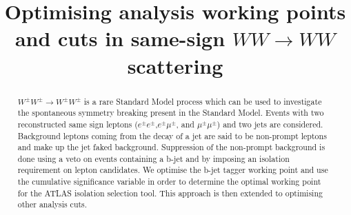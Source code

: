 \documentclass{article}
\title{Optimising analysis working points and cuts in same-sign $WW \longrightarrow WW$ scattering}
\begin{document}
\maketitle
\begin{abstract}
$ W^{\pm}W^{\pm} \longrightarrow W^{\pm}W^{\pm}$ is a rare Standard Model process which can be used to investigate the spontaneous symmetry breaking present in the Standard Model. Events with two reconstructed same sign leptons ($e^{\pm}e^{\pm}$,$e^{\pm}\mu^{\pm}$, and $\mu^{\pm}\mu^{\pm}$) and two jets are considered. Background leptons coming from the decay of a jet are said to be non-prompt leptons and make up the jet faked background. Suppression of the non-prompt background is done using a veto on events containing a b-jet and by imposing an isolation requirement on lepton candidates. We optimise the b-jet tagger working point and use the cumulative significance variable in order to determine the optimal working point for the ATLAS isolation selection tool. This approach is then extended to optimising other analysis cuts.
\end{abstract}
\end{document}
